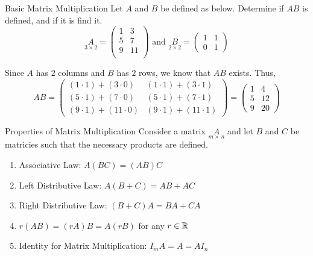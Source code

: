 \begin{example}{Basic Matrix Multiplication}{}
    Let $A$ and $B$ be defined as below. Determine if $AB$ is defined, and if it is find it.
    \[
        \underset{3 \times 2}{A} = \begin{pmatrix}
           1 & 3 \\
           5 & 7 \\
           9 & 11 \\ 
        \end{pmatrix}
        \text{ and }
        \underset{2 \times 2}{B} = \begin{pmatrix}
            1 & 1 \\ 0 & 1
        \end{pmatrix}
    \]
    \begin{solution}
        Since $A$ has $2$ columns and $B$ has $2$ rows, we know that $AB$ exists. Thus, 
        \[
            AB = \begin{pmatrix}
                \left(1 \cdot 1\right) + \left(3 \cdot 0\right) & \left(1 \cdot 1\right) + \left(3 \cdot 1\right) \\
                \left(5 \cdot 1\right) + \left(7 \cdot 0\right) & \left(5 \cdot 1\right) + \left(7 \cdot 1\right) \\
                \left(9 \cdot 1\right) + \left(11 \cdot 0\right) & \left(9 \cdot 1\right) + \left(11 \cdot 1\right)
            \end{pmatrix}
            = 
            \begin{pmatrix}
                1 & 4 \\
                5 & 12 \\
                9 & 20
            \end{pmatrix}
        \]
    \end{solution}
\end{example}

\begin{thm}{Properties of Matrix Multiplication}{}
    Consider a matrix $\underset{m\times\,n}{A}$ and let $B$ and $C$ be matricies such that the necessary products are defined.
    \begin{enumerate}
        \item Associative Law: $A(BC) = (AB)C$
        \item Left Distributive Law: $A(B+C) = AB + AC$
        \item Right Distributive Law: $(B+C)A = BA + CA$
        \item $r(AB) = (rA)B = A(rB)$ for any $r \in \mathbb R$
        \item Identity for Matrix Multiplication: $I_{m}A = A = AI_{n}$
    \end{enumerate}
\end{thm}

